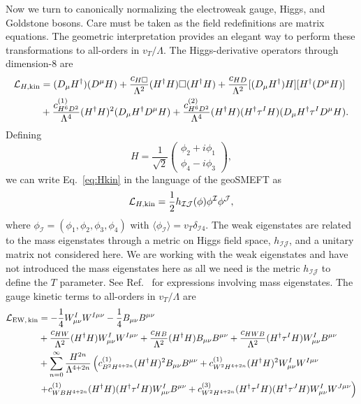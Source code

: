 Now we turn to canonically normalizing the electroweak gauge, Higgs, and Goldstone bosons.
Care must be taken as the field redefinitions are matrix equations.
The geometric interpretation provides an elegant way to perform these transformations to all-orders in $v_T / \Lambda$.
The Higgs-derivative operators through dimension-8 are
\begin{align}
\label{eq:Hkin}
\mathcal{L}_{H, \rm kin} &= (D_\mu H^\dag) (D^\mu H) + \frac{c_{H\Box}}{\Lambda^2} (H^\dag H) \Box (H^\dag H) + \frac{c_{HD}}{\Lambda^2} [(D_\mu H^\dag) H] [H^\dag (D^\mu H)] \nonumber\\ 
&+\frac{c_{H^6D^2}^{(1)}}{\Lambda^4} (H^\dag H)^2 (D_\mu H^\dag D^\mu H) + \frac{c_{H^6D^2}^{(2)}}{\Lambda^4} (H^\dag H) (H^\dag \tau^I H) (D_\mu H^\dag \tau^I D^\mu H) .
\end{align}
Defining
\begin{equation}
H = \frac{1}{\sqrt{2}} 
\begin{pmatrix}
\phi_2 + i \phi_1 \\
\phi_4 - i \phi_3
\end{pmatrix} ,
\end{equation}
we can write Eq.~\eqref{eq:Hkin} in the language of the geoSMEFT as 
\begin{equation}
\mathcal{L}_{H, \rm kin} = \frac{1}{2} h_{\mathcal{I} \mathcal{J}}(\phi) \phi^\mathcal{I} \phi^\mathcal{J}  ,
\end{equation}
where $\phi_\mathcal{I} = (\phi_1, \phi_2, \phi_3, \phi_4)$ with $\langle \phi_\mathcal{I} \rangle = v_T \delta_{\mathcal{I} 4}$.
The weak eigenstates are related to the mass eigenstates through a metric on Higgs field space, $h_{\mathcal{I} \mathcal{J}}$, and a unitary matrix not considered here.
We are working with the weak eigenstates and have not introduced the mass eigenstates here as all we need is the metric $h_{\mathcal{I} \mathcal{J}}$ to define the $T$ parameter.
See Ref.~\cite{Helset:2020yio} for expressions involving mass eigenstates.
The gauge kinetic terms to all-orders in $v_T / \Lambda$ are
\begin{align}
\label{eq:lew}
\mathcal{L}_{\rm EW,\, kin} &= - \frac{1}{4} W^I_{\mu\nu} W^{I\mu\nu} - \frac{1}{4}  B_{\mu\nu} B^{\mu\nu} \\
&+ \frac{c_{HW}}{\Lambda^2} (H^\dag H) W^I_{\mu\nu} W^{I\mu\nu} + \frac{c_{HB}}{\Lambda^2} (H^\dag H) B_{\mu\nu} B^{\mu\nu} + \frac{c_{HWB}}{\Lambda^2} (H^\dag \tau^I H) W^I_{\mu\nu} B^{\mu\nu}  \nonumber\\ 
&+ \sum_{n=0}^\infty \frac{H^{2n}}{\Lambda^{4+2n}} \left(c_{B^2H^{4+2n}}^{(1)}(H^\dag H)^2 B_{\mu\nu} B^{\mu\nu} + c_{W^2H^{4+2n}}^{(1)} (H^\dag H)^2 W^I_{\mu\nu} W^{I\mu\nu} \right. \nonumber\\ 
&\left. + c_{WBH^{4+2n}}^{(1)} (H^\dag H) (H^\dag \tau^I H) W^I_{\mu\nu} B^{\mu\nu} + c_{W^2H^{4+2n}}^{(3)} (H^\dag \tau^I H) (H^\dag \tau^J H) W^I_{\mu\nu} W^{J\mu\nu} \right)\nonumber
\end{align}
